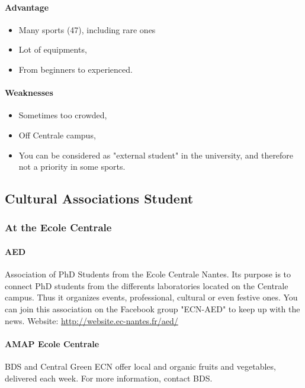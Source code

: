 \paragraph{Advantage}
\begin{itemize}
  \item Many sports (47), including rare ones
  \item Lot of equipments,
  \item From beginners to experienced.
\end{itemize}

\paragraph{Weaknesses}
\begin{itemize}
  \item Sometimes too crowded,
  \item Off Centrale campus,
  \item You can be considered as "external student" in the university, and therefore not a priority in some sports.
\end{itemize}

\subsection {Cultural Associations Student}
\subsubsection {At the Ecole Centrale}
\paragraph{AED} Association of PhD Students from the Ecole Centrale Nantes. Its purpose is to connect PhD students from the differents laboratories located on the Centrale campus. Thus it organizes events, professional, cultural or even festive ones.
You can join this association on the Facebook group "ECN-AED" to keep up with the news. Website: \url{http://website.ec-nantes.fr/aed/}
\paragraph{AMAP Ecole Centrale} BDS and Central Green ECN offer local and organic fruits and vegetables, delivered each week. For more information, contact BDS.



